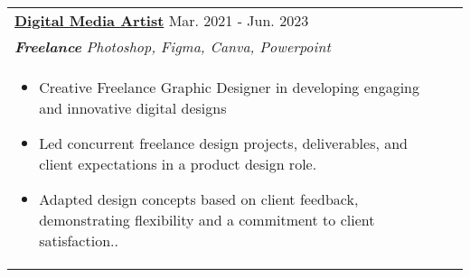 \documentclass[a4paper,8pt]{article}
\begin{document}
\begin{tabularx}{\linewidth}{ @{}l r@{} }
\color[HTML]{1C033C} \textbf{\uline{Digital Media Artist}} \hfill \color[HTML]{371e77} Mar. 2021 - Jun. 2023 \\[4pt]
\color[HTML]{371e77}\textbf{\textit{Freelance}} \hfill \color[HTML]{4B28A4} \textit{Photoshop, Figma, Canva, Powerpoint} \\[5pt]
\begin{minipage}[t]{\linewidth}
    \begin{itemize}[nosep,after=\strut, leftmargin=2em, itemsep=2pt]
        \item Creative Freelance Graphic Designer in developing engaging and innovative digital designs
        \item Led concurrent freelance design projects, deliverables, and client expectations in a product design role.
        \item Adapted design concepts based on client feedback, demonstrating flexibility and a commitment to client satisfaction..
    \end{itemize}
    \end{minipage}
\end{tabularx}

\end{document}
